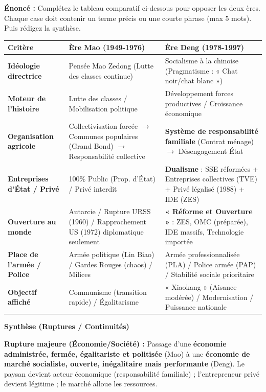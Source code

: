 \documentclass[11pt]{article}
\begin{document}
\begin{exoresolu}
\textbf{Énoncé :} Complétez le tableau comparatif ci-dessous pour opposer les deux ères. Chaque case doit contenir un terme précis ou une courte phrase (max 5 mots). Puis rédigez la synthèse.

\begin{center}
\begin{tabularx}{\linewidth}{|l|X|X|}\hline
\textbf{Critère} & \textbf{Ère Mao (1949-1976)} & \textbf{Ère Deng (1978-1997)} \\ \hline
\textbf{Idéologie directrice} & Pensée Mao Zedong (Lutte des classes continue) & Socialisme à la chinoise (Pragmatisme : « Chat noir/chat blanc ») \\ \hline
\textbf{Moteur de l'histoire} & Lutte des classes / Mobilisation politique & Développement forces productives / Croissance économique \\ \hline
\textbf{Organisation agricole} & Collectivisation forcée $\rightarrow$ Communes populaires (Grand Bond) $\rightarrow$ Responsabilité collective & \textbf{Système de responsabilité familiale} (Contrat ménage) $\rightarrow$ Désengagement État \\ \hline
\textbf{Entreprises d'État / Privé} & 100\% Public (Prop. d'État) / Privé interdit & \textbf{Dualisme} : SSE réformées + Entreprises collectives (TVE) + Privé légalisé (1988) + IDE (ZES) \\ \hline
\textbf{Ouverture au monde} & Autarcie / Rupture URSS (1960) / Rapprochement US (1972) diplomatique seulement & \textbf{« Réforme et Ouverture »} : ZES, OMC (préparée), IDE massifs, Technologie importée \\ \hline
\textbf{Place de l'armée / Police} & Armée politique (Lin Biao) / Gardes Rouges (chaos) / Milices & Armée professionnalisée (PLA) / Police armée (PAP) / Stabilité sociale prioritaire \\ \hline
\textbf{Objectif affiché} & Communisme (transition rapide) / Égalitarisme & « Xiaokang » (Aisance modérée) / Modernisation / Puissance nationale \\ \hline
\end{tabularx}
\end{center}

\textbf{Synthèse (Ruptures / Continuités)}

\textbf{Rupture majeure (Économie/Société) :} Passage d'une \textbf{économie administrée, fermée, égalitariste et politisée} (Mao) à une \textbf{économie de marché socialiste, ouverte, inégalitaire mais performante} (Deng). Le paysan devient acteur économique (responsabilité familiale) ; l'entrepreneur privé devient légitime ; le marché alloue les ressources.


\end{exoresolu}
\end{document}

